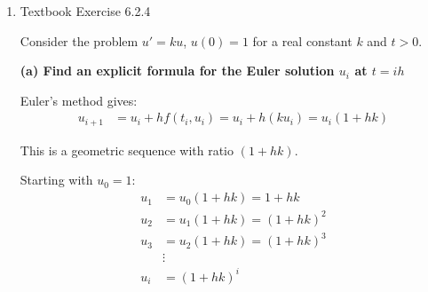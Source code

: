 \documentclass[reqno]{exam}
\begin{document}
\begin{enumerate}
\begin{solution}
          \textit{Alternative verification:} We can also verify consistency by checking that the local truncation error is $O(h)$.

          Let $u(t)$ be the exact solution satisfying $u'(t) = f(t, u(t))$. The local truncation error is:
          \begin{align*}
            \tau_i & = \frac{u(t_{i+1}) - u(t_i)}{h} - \phi(t_i, u(t_i), h)                  \\
                   & = \frac{u(t_i + h) - u(t_i)}{h} - f(t_i + h, u(t_i) + h f(t_i, u(t_i)))
          \end{align*}

          Using Taylor expansion: $u(t_i + h) = u(t_i) + h u'(t_i) + O(h^2) = u(t_i) + h f(t_i, u(t_i)) + O(h^2)$

          And: $f(t_i + h, u(t_i) + h f(t_i, u(t_i))) = f(t_i, u(t_i)) + O(h)$

          Thus:
          \begin{align*}
            \tau_i & = \frac{u(t_i) + h f(t_i, u(t_i)) + O(h^2) - u(t_i)}{h} - f(t_i, u(t_i)) - O(h) \\
                   & = f(t_i, u(t_i)) + O(h) - f(t_i, u(t_i)) - O(h)                                 \\
                   & = O(h)
          \end{align*}

          Since $\tau_i \to 0$ as $h \to 0$, the method is consistent.
        \end{solution}


  \item Textbook Exercise 6.2.4
        \begin{solution}
          Consider the problem $u' = ku$, $u(0) = 1$ for a real constant $k$ and $t > 0$.

          \medskip

          \textbf{(a) Find an explicit formula for the Euler solution $u_i$ at $t = ih$}

          Euler's method gives:
          \begin{align*}
            u_{i+1} & = u_i + h f(t_i, u_i) = u_i + h(ku_i) = u_i(1 + hk)
          \end{align*}

          This is a geometric sequence with ratio $(1 + hk)$.

          Starting with $u_0 = 1$:
          \begin{align*}
            u_1 & = u_0(1 + hk) = 1 + hk     \\
            u_2 & = u_1(1 + hk) = (1 + hk)^2 \\
            u_3 & = u_2(1 + hk) = (1 + hk)^3 \\
                & \vdots                     \\
            u_i & = (1 + hk)^i
          \end{align*}


\end{solution}
\end{enumerate}
\end{document}
